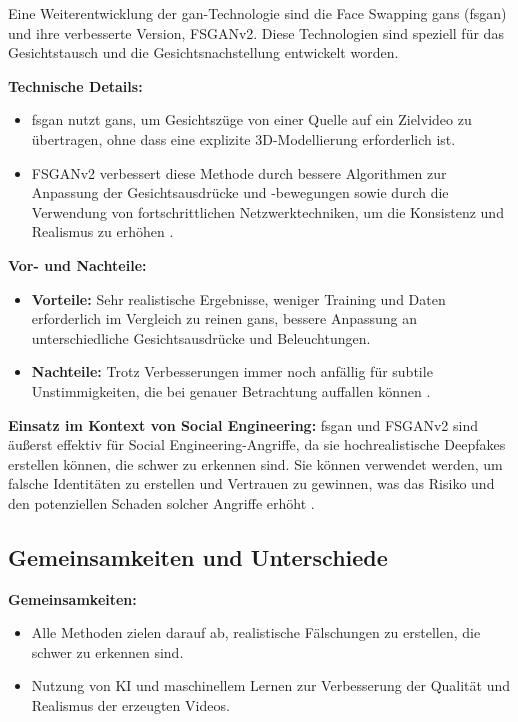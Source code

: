 Eine Weiterentwicklung der \gls{gan}-Technologie sind die Face Swapping \glspl{gan} (\gls{fsgan}) und ihre verbesserte Version, FSGANv2.
Diese Technologien sind speziell für das Gesichtstausch und die Gesichtsnachstellung entwickelt worden.

\textbf{Technische Details:}
\begin{itemize}
    \item \gls{fsgan} nutzt \glspl{gan}, um Gesichtszüge von einer Quelle auf ein Zielvideo zu übertragen, ohne dass eine explizite 3D-Modellierung erforderlich ist.
    \item FSGANv2 verbessert diese Methode durch bessere Algorithmen zur Anpassung der Gesichtsausdrücke und -bewegungen sowie durch die Verwendung von fortschrittlichen Netzwerktechniken, um die Konsistenz und Realismus zu erhöhen \cite{fsganv2}.
\end{itemize}

\textbf{Vor- und Nachteile:}
\begin{itemize}
    \item \textbf{Vorteile:} Sehr realistische Ergebnisse, weniger Training und Daten erforderlich im Vergleich zu reinen \glspl{gan}, bessere Anpassung an unterschiedliche Gesichtsausdrücke und Beleuchtungen.
    \item \textbf{Nachteile:} Trotz Verbesserungen immer noch anfällig für subtile Unstimmigkeiten, die bei genauer Betrachtung auffallen können \cite{face-swapping-and-reenactment}.
\end{itemize}

\textbf{Einsatz im Kontext von Social Engineering:} \gls{fsgan} und FSGANv2 sind äußerst effektiv für Social Engineering-Angriffe, da sie hochrealistische Deepfakes erstellen können, die schwer zu erkennen sind.
Sie können verwendet werden, um falsche Identitäten zu erstellen und Vertrauen zu gewinnen, was das Risiko und den potenziellen Schaden solcher Angriffe erhöht \cite{deepfacelab}.

\subsection{Gemeinsamkeiten und Unterschiede}\label{subsec:gemeinsamkeiten-unterschiede}

\textbf{Gemeinsamkeiten:}
\begin{itemize}
    \item Alle Methoden zielen darauf ab, realistische Fälschungen zu erstellen, die schwer zu erkennen sind.
    \item Nutzung von KI und maschinellem Lernen zur Verbesserung der Qualität und Realismus der erzeugten Videos.
\end{itemize}

